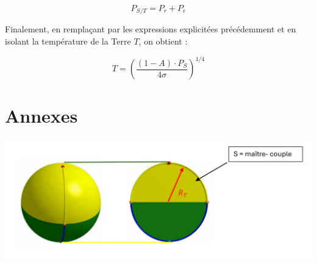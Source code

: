 \documentclass[a4paper,11pt]{article}
\begin{document}
\[ P_{S/T} = P_r + P_e \]

Finalement, en remplaçant par les expressions explicitées précédemment et en isolant la température de la Terre $T$, on obtient :

\[ T = \left(\dfrac{(1 - A) \cdot P_S}{4\sigma}\right)^{1/4} \]

\section{Annexes}

\begin{adjustbox}{center}
\includegraphics[scale=0.9]{Schema_maitre_couple}
\end{adjustbox}
\end{document}
